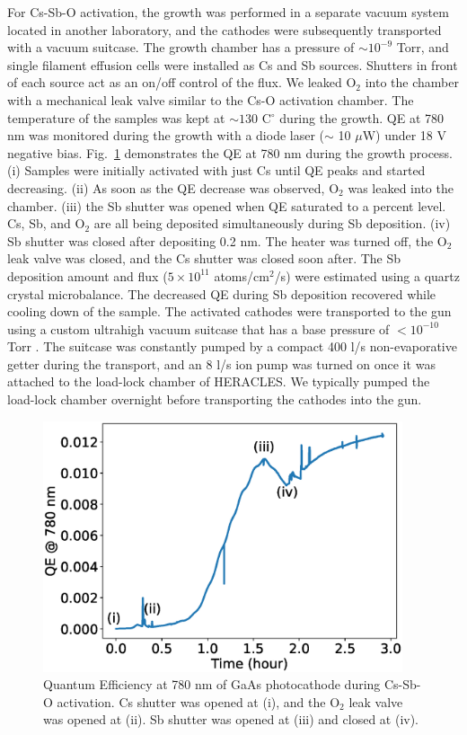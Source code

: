 For Cs-Sb-O activation, the growth was performed in a separate vacuum system located in another laboratory, and the cathodes were subsequently transported with a vacuum suitcase. The growth chamber has a pressure of $\sim 10^{-9}$ Torr, and single filament effusion cells were installed as Cs and Sb sources. Shutters in front of each source act as an on/off control of the flux. We leaked O$_2$ into the chamber with a mechanical leak valve similar to the Cs-O activation chamber. The temperature of the samples was kept at $\sim 130$ C$^\circ$ during the growth. QE at 780 nm was monitored during the growth with a diode laser ($\sim$ 10 $\mu$W) under 18 V negative bias.\cite{feng2019_activation}
Fig.~\ref{fig_growth22} demonstrates the QE at 780 nm during the growth process. (i) Samples were initially activated with just Cs until QE peaks and started decreasing. (ii) As soon as the QE decrease was observed, O$_2$ was leaked into the chamber. (iii) the Sb shutter was opened when QE saturated to a percent level. Cs, Sb, and O$_2$ are all being deposited simultaneously during Sb deposition. (iv) Sb shutter was closed after depositing 0.2 nm. The heater was turned off, the O$_2$ leak valve was closed, and the Cs shutter was closed soon after. The Sb deposition amount and flux ($5 \times 10^{11}$ atoms/cm$^2$/s) were estimated using a quartz crystal microbalance. The decreased QE during Sb deposition recovered while cooling down of the sample.
The activated cathodes were transported to the gun using a custom ultrahigh vacuum suitcase that has a base pressure of $< 10^{-10}$ Torr \cite{galdi2020_EffectsOxygeninducedPhase}. The suitcase was constantly pumped by a compact 400 l/s non-evaporative getter during the transport, and an 8 l/s ion pump was turned on once it was attached to the load-lock chamber of HERACLES. We typically pumped the load-lock chamber overnight before transporting the cathodes into the gun.


\begin{figure}
	\centering
	\includegraphics*[width=300pt]{figs/heracles/growth.eps}
	\caption{Quantum Efficiency at 780 nm of GaAs photocathode during Cs-Sb-O activation. Cs shutter was opened at (i), and the O$_2$ leak valve was opened at (ii). Sb shutter was opened at (iii) and closed at (iv).}
	\label{fig_growth22}
\end{figure}


